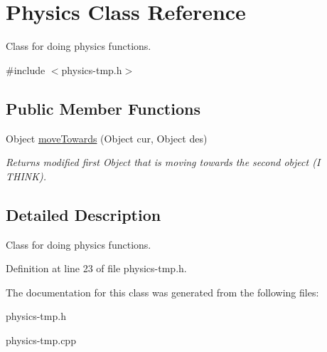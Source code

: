 \hypertarget{classPhysics}{}\section{Physics Class Reference}
\label{classPhysics}


Class for doing physics functions.  




{\ttfamily \#include $<$physics-\/tmp.\+h$>$}

\subsection*{Public Member Functions}
\begin{DoxyCompactItemize}
\item 
Object \hyperlink{classPhysics_a8e53f9bf088c0d4f208b3c2029d69ab2}{move\+Towards} (Object cur, Object des)\hypertarget{classPhysics_a8e53f9bf088c0d4f208b3c2029d69ab2}{}\label{classPhysics_a8e53f9bf088c0d4f208b3c2029d69ab2}

\begin{DoxyCompactList}\small\item\em Returns modified first Object that is moving towards the second object (I T\+H\+I\+NK). \end{DoxyCompactList}\end{DoxyCompactItemize}


\subsection{Detailed Description}
Class for doing physics functions. 

Definition at line 23 of file physics-\/tmp.\+h.



The documentation for this class was generated from the following files\+:\begin{DoxyCompactItemize}
\item 
physics-\/tmp.\+h\item 
physics-\/tmp.\+cpp\end{DoxyCompactItemize}
